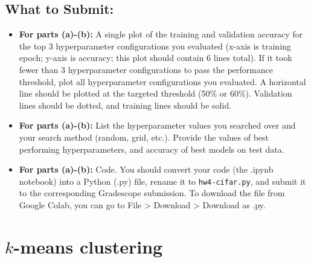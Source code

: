 \documentclass{article}
\begin{document}
\begin{aprob}
\subsection*{What to Submit:}
\begin{itemize}
    \item \textbf{For parts (a)-(b):} A single plot of the training and validation accuracy for the top 3 hyperparameter configurations you evaluated (x-axis is training epoch; y-axis is accuracy; this plot should contain 6 lines total). If it took fewer than 3 hyperparameter configurations to pass the performance threshold, plot all hyperparameter configurations you evaluated. A horizontal line should be plotted at the targeted threshold (50\% or 60\%). Validation lines should be dotted, and training lines should be solid.
    \item \textbf{For parts (a)-(b):} List the hyperparameter values you searched over and your search method (random, grid, etc.). Provide the values of best performing hyperparameters, and accuracy of best models on test data.
    \item \textbf{For parts (a)-(b):} Code. You should convert your code (the .ipynb notebook) into a Python (.py) file, rename it to \texttt{hw4-cifar.py}, and submit it to the corresponding Gradescope submission. To download the file from Google Colab, you can go to File > Download > Download as .py.
\end{itemize}
\end{aprob}


\newpage
\section*{$k$-means clustering}
\end{document}
